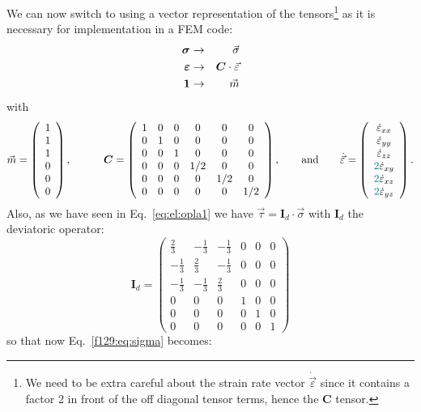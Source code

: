 We can now switch to using a vector representation of the tensors\footnote{We need 
to be extra careful about the strain rate vector $\dot{\vec{\varepsilon}}$ since 
it contains a factor 2 in front of the off diagonal tensor terms, hence the ${\bm C}$ tensor.} 
as it is necessary for implementation in a FEM code:
\begin{eqnarray}
{\bm \sigma} &\rightarrow& \vec{\sigma} \nonumber\\
{\bm \varepsilon} &\rightarrow& {\bm C} \cdot \vec{\varepsilon} \nonumber\\
{\bm 1} &\rightarrow& \vec{m} \nonumber
\end{eqnarray}
with 
\[
\vec{m}=
\left(
\begin{array}{c}
1 \\ 1 \\ 1 \\ 0 \\ 0 \\ 0
\end{array}
\right),
\qquad\quad
{\bm C}=
\left(
\begin{array}{cccccc}
1 & 0 & 0 & 0 & 0 & 0 \\
0 & 1 & 0 & 0 & 0 & 0 \\
0 & 0 & 1 & 0 & 0 & 0 \\
0 & 0 & 0 & 1/2 & 0 & 0 \\
0 & 0 & 0 & 0 & 1/2 & 0 \\
0 & 0 & 0 & 0 & 0 & 1/2 
\end{array}
\right),
\qquad
{\rm and} 
\qquad
\dot{\vec{\varepsilon}}=
\left(
\begin{array}{c}
\dot\varepsilon_{xx}\\ 
\dot\varepsilon_{yy}\\ 
\dot\varepsilon_{zz}\\ 
{\color{teal}2}\dot\varepsilon_{xy} \\ 
{\color{teal}2}\dot\varepsilon_{xz} \\ 
{\color{teal}2}\dot\varepsilon_{yz}
\end{array}
\right).
\]
Also, as we have seen in Eq.~\eqref{eq:el:opla1} we have
$\vec\tau = {\bm I}_d \cdot \vec\sigma$
with ${\bm I}_d$ the deviatoric operator:
\[
{\bm I}_d=
\left(
\begin{array}{cccccc}
\frac23 & - \frac13 & - \frac13 & 0 & 0 & 0 \\
-\frac13 & \frac23 & - \frac13  & 0 & 0 & 0\\
-\frac13& - \frac13 & \frac23  & 0 & 0 & 0\\
0&0&0& 1&0 &0  \\
0&0&0&0&1 &0\\
0&0&0&0&0& 1
\end{array}
\right)
\]
so that now Eq.~\eqref{f129:eq:sigma} becomes:

